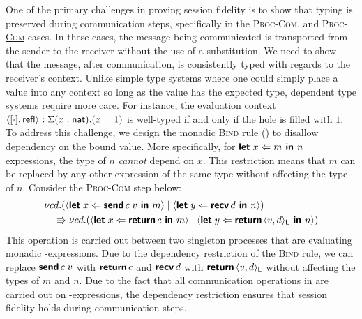 One of the primary challenges in proving session fidelity is to show that typing
is preserved during communication steps, specifically in the \textsc{Proc-Com}, and
\textsc{Proc-\underline{Com}} cases. In these cases, the message being
communicated is transported from the sender to the receiver without the use of a
substitution. We need to show that the message, after communication, is
consistently typed with regards to the receiver's context. Unlike simple type
systems where one could simply place a value into any context so long as
the value has the expected type, dependent type systems require more care. For
instance, the evaluation context $\langle{{[\cdot]},{\textsf{refl}}}\rangle_{} : \Sigma(x : \textsf{nat}).(x = 1)$ 
is well-typed if and only if the hole is filled with $1$. To address this challenge, 
we design the monadic \textsc{Bind} rule ()
to disallow dependency on the bound value. More specifically, for
$\textbf{\textsf{let}}\;{x}\Leftarrow{m}\textbf{\textsf{ in }}{n}$ expressions, the type of $n$ \emph{cannot} depend on $x$. This
restriction means that $m$ can be replaced by any other expression of the same
type without affecting the type of $n$. Consider the \textsc{Proc-Com} step below:
\begin{align*}
  &{\nu{cd}.{({\langle{\textbf{\textsf{let}}\;{x}\Leftarrow{{\textbf{\textsf{send}}\,{c}}\;{v}}\textbf{\textsf{ in }}{m}}\rangle} \mid {\langle{\textbf{\textsf{let}}\;{y}\Leftarrow{\textbf{\textsf{recv}}\,{d}}\textbf{\textsf{ in }}{n}}\rangle})}} \\
  &\quad\Rrightarrow {\nu{cd}.{({\langle{\textbf{\textsf{let}}\;{x}\Leftarrow{\textbf{\textsf{return}}\,{c}}\textbf{\textsf{ in }}{m}}\rangle} \mid {\langle{\textbf{\textsf{let}}\;{y}\Leftarrow{\textbf{\textsf{return}}\,{\langle{{v},{d}}\rangle_{\textsf{L}}}}\textbf{\textsf{ in }}{n}}\rangle})}}
\end{align*}
This operation is carried out between two singleton processes that are
evaluating monadic -expressions. Due to the dependency restriction of
the \textsc{Bind} rule, we can replace ${\textbf{\textsf{send}}\,{c}}\;{v}$ with $\textbf{\textsf{return}}\,{c}$
and $\textbf{\textsf{recv}}\,{d}$ with $\textbf{\textsf{return}}\,{\langle{{v},{d}}\rangle_{\textsf{L}}}$ without affecting the types of
$m$ and $n$. Due to the fact that all communication operations in \TLLC{} are
carried out on -expressions, the dependency restriction ensures that
session fidelity holds during communication steps.

